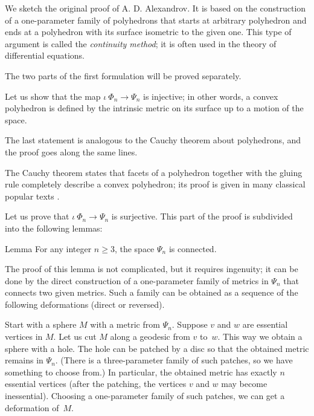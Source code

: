 We sketch the original proof of A. D. Alexandrov.
It is based on the  construction of a one-parameter family of polyhedrons that starts at arbitrary polyhedron
and ends at a polyhedron with its surface isometric to the given one.
This type of argument is called the \emph{continuity method}; it is often used in the theory of differential equations.

\medskip

The two parts of the first formulation will be proved separately.

 Let us show that the map $\iota\:\Phi_n\to\Psi_n$ is injective;
in other words, a convex polyhedron is defined by the intrinsic metric on its surface up to a motion of the space.

The last statement is analogous to the Cauchy theorem about polyhedrons,
and the proof goes along the same lines. 

The Cauchy theorem states that facets of a polyhedron together with the gluing rule completely describe a convex polyhedron;
its proof is given in many classical popular texts \cite{aigner-zigler,dolbilin,tabacnikov-fuks}.

\medskip

Let us prove that $\iota\:\Phi_n\to\Psi_n$ is surjective.
This part of the proof is subdivided into the following lemmas:

\begin{thm}{Lemma}
For any integer $n\ge 3$, the space $\Psi_n$ is connected.
\end{thm}

The proof of this lemma is not complicated, but it requires ingenuity;
it can be done by the direct construction of a one-parameter family of metrics in $\Psi_n$ that connects two given metrics.
Such a family can be obtained as a sequence of the following deformations (direct or reversed).

Start with a sphere $M$ with a metric from $\Psi_n$.
Suppose $v$ and $w$ are essential vertices in $M$.
Let us cut $M$ along a geodesic from $v$ to~$w$.
This way we obtain a sphere with a hole.
The hole can be patched by a disc so that the obtained metric remains in $\Psi_n$.
(There is a three-parameter family of such patches, so we have something to choose from.)
In particular, the obtained metric has exactly $n$ essential vertices (after the patching, the vertices $v$ and $w$ may become inessential).
Choosing a one-parameter family of such patches, we can get a deformation of~$M$.


